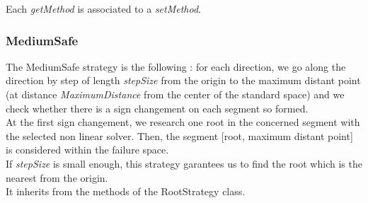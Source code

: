 \begin{description}
Each \textit{getMethod}  is associated to a \textit{setMethod}.

\end{description}

\newpage
\subsubsection{MediumSafe}

The MediumSafe strategy is the following : for each direction, we go along the direction by step of length {\itshape stepSize} from the origin to the maximum distant point (at distance {\itshape MaximumDistance} from the center of the standard space) and we check whether there is a sign changement on each segment so formed.\\
At the first sign changement, we research one root in the concerned segment with the selected non linear solver. Then, the segment [root, maximum distant point] is considered within the failure space. \\
If {\itshape stepSize} is small enough, this strategy garantees us to find the root which is the nearest from the origin.\\

It inherits from the methods of the RootStrategy class.

